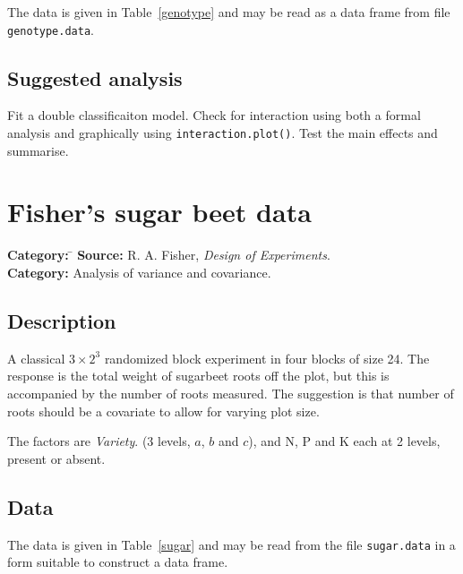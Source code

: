 \documentclass{article}
\newcommand{\code}[1]{\texttt{#1}}
\begin{document}
The data is given in Table~\ref{genotype} and may be read as a data frame from
file \code{genotype.data}.

\subsection*{Suggested analysis}
Fit a double classificaiton model.  Check for interaction using both a
formal analysis and graphically using \code{interaction.plot()}.  Test the
main effects and summarise.

\clearpage\section{Fisher's sugar beet data}
\begin{tabbing}
\textbf{Category:} \= \kill
\textbf{Source:} \> R. A. Fisher, \textsl{Design of Experiments}.\\
\textbf{Category:} \> Analysis of variance and covariance.
\end{tabbing}

\subsection*{Description}
A classical $3\times2^3$ randomized block experiment in four blocks of size
24.  The response is the total weight of sugarbeet roots off the plot, but
this is accompanied by the number of roots measured.  The suggestion is
that number of roots should be a covariate to allow for varying plot size.

The factors are \textsl{Variety}. (3 levels, $a$, $b$ and $c$), and N, P and K
each at 2 levels, present or absent.

\subsection*{Data}
The data is given in Table~\ref{sugar} and may be read from the file
\texttt{sugar.data} in a form suitable to construct a data frame.
\end{document}
